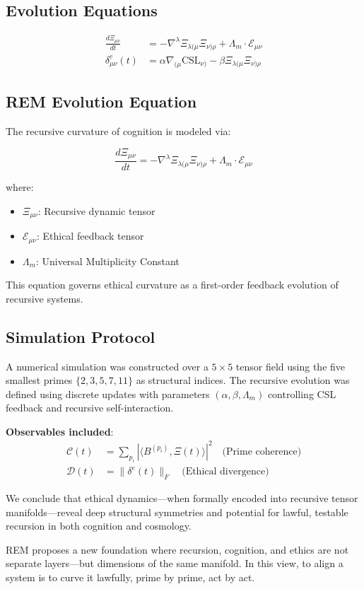 \documentclass{article}
\theoremstyle{plain}
\begin{document}
\subsection{Evolution Equations}

\begin{align*}
\frac{d \Xi_{\mu\nu}}{dt} &= - \nabla^\lambda \Xi_{\lambda(\mu} \Xi_{\nu)\rho} + \Lambda_m \cdot \mathcal{E}_{\mu\nu} \\
\delta^e_{\mu\nu}(t) &= \alpha \nabla_{(\mu} \text{CSL}_{\nu)} - \beta \Xi_{\lambda(\mu} \Xi_{\nu)\rho}
\end{align*}

\subsection{REM Evolution Equation}

The recursive curvature of cognition is modeled via:

\[
\frac{d \Xi_{\mu\nu}}{dt} = -\nabla^\lambda \Xi_{\lambda(\mu} \Xi_{\nu)\rho} + \Lambda_m \cdot \mathcal{E}_{\mu\nu}
\]

where:
\begin{itemize}
  \item $\Xi_{\mu\nu}$: Recursive dynamic tensor
  \item $\mathcal{E}_{\mu\nu}$: Ethical feedback tensor
  \item $\Lambda_m$: Universal Multiplicity Constant
\end{itemize}

This equation governs ethical curvature as a first-order feedback evolution of recursive systems.

\subsection{Simulation Protocol}

A numerical simulation was constructed over a $5 \times 5$ tensor field using the five smallest primes $\{2, 3, 5, 7, 11\}$ as structural indices. The recursive evolution was defined using discrete updates with parameters $(\alpha, \beta, \Lambda_m)$ controlling CSL feedback and recursive self-interaction.

\textbf{Observables included}:
\begin{align*}
\mathcal{C}(t) &= \sum_{p_i} \left| \langle B^{(p_i)}, \Xi(t) \rangle \right|^2 \quad \text{(Prime coherence)} \\
\mathcal{D}(t) &= \| \delta^e(t) \|_F \quad \text{(Ethical divergence)}
\end{align*}

We conclude that ethical dynamics—when formally encoded into recursive tensor manifolds—reveal deep structural symmetries and potential for lawful, testable recursion in both cognition and cosmology.

REM proposes a new foundation where recursion, cognition, and ethics are not separate layers—but dimensions of the same manifold. In this view, to align a system is to curve it lawfully, prime by prime, act by act.



\nocite{*}


\end{document}
